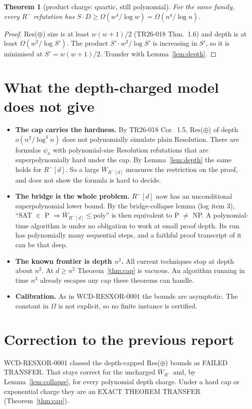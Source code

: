 \documentclass[11pt]{article}
\newtheorem{theorem}{Theorem}
\begin{document}
\begin{theorem}[product charge: quartic, still polynomial]\label{thm:prod}
For the same family, every $R^-$ refutation has $S\cdot D\ge\Omega(w^4/\log w)=\Omega(n^4/\log n)$.
\end{theorem}
\begin{proof}
Res($\oplus$) size is at least $w(w+1)/2$ (TR26-018 Thm.~1.6) and depth is at least $\Omega(w^2/\log S')$. The product $S'\cdot w^2/\log S'$ is increasing in $S'$, so it is minimised at $S'=w(w+1)/2$. Transfer with Lemma~\ref{lem:depth}.
\end{proof}

\section{What the depth-charged model does not give}
\begin{itemize}
\item \textbf{The cap carries the hardness.} By TR26-018 Cor.~1.5, Res($\oplus$) of depth $o(n^2/\log^4 n)$ does not polynomially simulate plain Resolution. There are formulas $\psi_n$ with polynomial-size Resolution refutations that are superpolynomially hard under the cap. By Lemma~\ref{lem:depth} the same holds for $R^-[d]$. So a large $\overline W_{R^-[d]}$ measures the restriction on the proof, and does not show the formula is hard to decide.
\item \textbf{The bridge is the whole problem.} $R^-[d]$ now has an unconditional superpolynomial lower bound. By the bridge-collapse lemma (log item 3), ``SAT $\in$ P $\Rightarrow\overline W_{R^-[d]}\le\mathrm{poly}$'' is then equivalent to P $\ne$ NP. A polynomial-time algorithm is under no obligation to work at small proof depth. Its run has polynomially many sequential steps, and a faithful proof transcript of it can be that deep.
\item \textbf{The known frontier is depth $n^2$.} All current techniques stop at depth about $n^2$. At $d\ge n^2$ Theorem~\ref{thm:cap} is vacuous. An algorithm running in time $n^3$ already escapes any cap these theorems can handle.
\item \textbf{Calibration.} As in WCD-RESXOR-0001 the bounds are asymptotic. The constant in $\Omega$ is not explicit, so no finite instance is certified.
\end{itemize}

\section{Correction to the previous report}
WCD-RESXOR-0001 classed the depth-capped Res($\oplus$) bounds as FAILED TRANSFER. That stays correct for the uncharged $\overline W_{R^-}$ and, by Lemma~\ref{lem:collapse}, for every polynomial depth charge. Under a hard cap or exponential charge they are an EXACT THEOREM TRANSFER (Theorem~\ref{thm:cap}).
\end{document}
